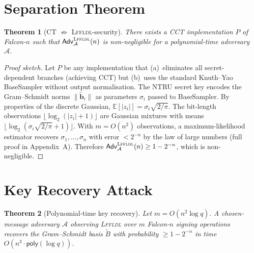 \documentclass[sigconf,anonymous]{acmart}
\newtheorem{theorem}{Theorem}
\begin{document}
\section{Separation Theorem}
\label{sec:separation}

\begin{theorem}[CT $\not\Rightarrow$ \textsc{Lffldl}-security]
\label{thm:sep}
There exists a CCT implementation $P$ of Falcon-$n$ such that
$\mathsf{Adv}^{\textsc{Lffldl}}_{\mathcal{A}}(n)$ is non-negligible for a
polynomial-time adversary $\mathcal{A}$.
\end{theorem}

\begin{proof}[Proof sketch]
Let $P$ be any implementation that (a)~eliminates all secret-dependent branches
(achieving CCT) but (b)~uses the standard Knuth--Yao BaseSampler without output
normalisation.  The NTRU secret key encodes the Gram--Schmidt norms
$\|\widetilde{\mathbf{b}}_i\|$ as parameters $\sigma_i$ passed to BaseSampler.
By properties of the discrete Gaussian,
$\mathbb{E}[|z_i|] = \sigma_i\sqrt{2/\pi}$.  The bit-length observations
$\lfloor\log_2(|z_i|+1)\rfloor$ are Gaussian mixtures with means
$\lfloor\log_2(\sigma_i\sqrt{2/\pi}+1)\rfloor$.  With $m=O(n^2)$ observations,
a maximum-likelihood estimator recovers $\sigma_1,\ldots,\sigma_n$ with error
$<2^{-n}$ by the law of large numbers (full proof in Appendix~A).
Therefore $\mathsf{Adv}^{\textsc{Lffldl}}_{\mathcal{A}}(n) \ge 1-2^{-n}$,
which is non-negligible.
\end{proof}

\section{Key Recovery Attack}
\label{sec:attack}

\begin{theorem}[Polynomial-time key recovery]
\label{thm:kr}
Let $m = O(n^2\log q)$.  A chosen-message adversary $\mathcal{A}$ observing
\textsc{Lffldl} over $m$ Falcon-$n$ signing operations recovers the
Gram--Schmidt basis $\widetilde{B}$ with probability $\ge 1-2^{-n}$ in time
$O(n^3\cdot\mathsf{poly}(\log q))$.
\end{theorem}
\end{document}
